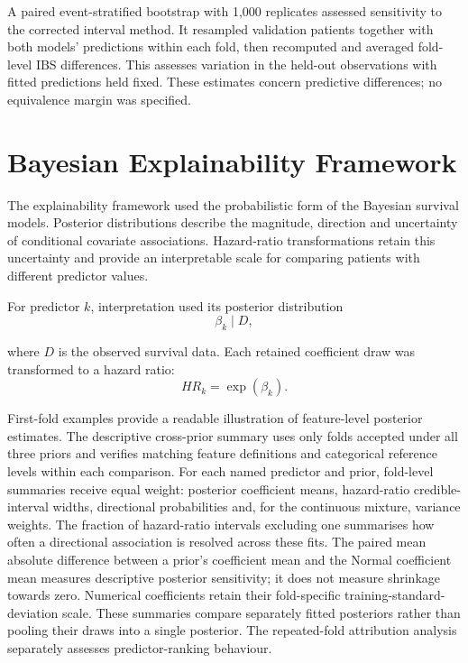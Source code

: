 A paired event-stratified bootstrap with 1,000 replicates assessed sensitivity to the corrected interval method. It resampled validation patients together with both models' predictions within each fold, then recomputed and averaged fold-level IBS differences. This assesses variation in the held-out observations with fitted predictions held fixed. These estimates concern predictive differences; no equivalence margin was specified.

\section{Bayesian Explainability Framework}\label{bayesian-explainability-framework}

The explainability framework used the probabilistic form of the Bayesian survival models. Posterior distributions describe the magnitude, direction and uncertainty of conditional covariate associations. Hazard-ratio transformations retain this uncertainty and provide an interpretable scale for comparing patients with different predictor values.

For predictor $k$, interpretation used its posterior distribution
\begin{equation}
    \beta_{k} \mid D,
\end{equation}


where \(D\) is the observed survival data. Each retained coefficient draw was transformed to a hazard ratio:
\begin{equation}
    HR_{k} = \exp\left( \beta_{k} \right).
\end{equation}


First-fold examples provide a readable illustration of feature-level posterior estimates. The descriptive cross-prior summary uses only folds accepted under all three priors and verifies matching feature definitions and categorical reference levels within each comparison. For each named predictor and prior, fold-level summaries receive equal weight: posterior coefficient means, hazard-ratio credible-interval widths, directional probabilities and, for the continuous mixture, variance weights. The fraction of hazard-ratio intervals excluding one summarises how often a directional association is resolved across these fits. The paired mean absolute difference between a prior's coefficient mean and the Normal coefficient mean measures descriptive posterior sensitivity; it does not measure shrinkage towards zero. Numerical coefficients retain their fold-specific training-standard-deviation scale. These summaries compare separately fitted posteriors rather than pooling their draws into a single posterior. The repeated-fold attribution analysis separately assesses predictor-ranking behaviour.

